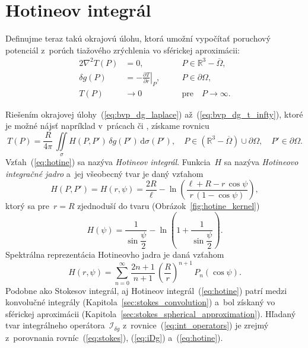 \documentclass[a4paper, 12pt]{book}
\newcommand{\diff}{\mathrm d}
\begin{document}
\section{Hotineov integrál}
\label{sec:hotine_integral}

Definujme teraz takú okrajovú úlohu, ktorá umožní vypočítať poruchový potenciál 
z~porúch tiažového zrýchlenia vo sférickej aproximácii:
%
\begin{alignat}{2}
\nabla^2 T(P) &= 0{,} &&P \in \mathbb{R}^3 
- \overline\Omega{,}\label{eq:bvp_dg_laplace}\\
\delta g(P) &= -\left.\frac{\partial T}{\partial r}\right|_P{,} \quad &&P \in 
\partial\Omega{,}\label{eq:bvp_dg_boundary_condition}\\
T(P) &\rightarrow 0 &&\textrm{pre} \quad P \rightarrow 
\infty{.}\label{eq:bvp_dg_t_infty}
\end{alignat}

Riešením okrajovej úlohy~(\ref{eq:bvp_dg_laplace}) 
až~(\ref{eq:bvp_dg_t_infty}), ktoré je možné nájsť napríklad v~prácach 
\textcite{MoritzPhysicalGeodesy} či \textcite{SansoGeoidDetermination}, získame 
rovnicu
%
\begin{equation}
\label{eq:hotine}
T(P) = \frac{R}{4\pi} \, \iint\limits_{\sigma} H(P, P') \, \delta g(P') \, 
\diff \sigma(P'){,} \quad P \in \left( \mathbb{R}^3 - \overline\Omega \right) 
\cup \partial\Omega{,} \quad P' \in \partial\Omega{.}
\end{equation}
%
Vzťah~(\ref{eq:hotine}) sa nazýva \emph{Hotineov integrál}.  Funkcia~$H$ sa 
nazýva \emph{Hotineovo integračné jadro} a~jej všeobecný tvar je daný vzťahom 
\parencite{SansoGeoidDetermination}
%
\begin{equation}
\label{eq:hotine_kernel_general}
H(P, P') = H(r, \psi) = \frac{2R}{\ell} - \ln\left(\frac{\ell + R - r \, 
\cos\psi}{r \, (1 - \cos\psi)}\right){,}
\end{equation}
%
ktorý sa pre~$r = R$ zjednoduší do tvaru (Obrázok~\ref{fig:hotine_kernel})
%
\begin{equation}
\label{eq:hotine_kernel}
H(\psi) = \frac{1}{\sin\dfrac{\psi}{2}} - \ln\left( 
1 + \frac{1}{\sin\dfrac{\psi}{2}} \right){.}
\end{equation}
%
Spektrálna reprezentácia Hotineovho jadra je daná vzťahom
%
\begin{equation}
\label{eq:hotine_spectral}
H(r, \psi) = \sum_{n = 0}^{\infty} \frac{2n + 1}{n + 1} \, \left( \frac{R}{r} 
\right)^{n + 1} \, P_n(\cos\psi){.}
\end{equation}
%
Podobne ako Stokesov integrál, aj Hotineov integrál~(\ref{eq:hotine}) patrí 
medzi konvolučné integrály (Kapitola~\ref{sec:stokes_convolution}) a~bol 
získaný vo sférickej aproximácii 
(Kapitola~\ref{sec:stokes_spherical_approximation}).  Hľadaný tvar integrálneho 
operátora~$\mathcal{I}_{\delta g}$ z~rovnice~(\ref{eq:int_operators}) je zrejmý 
z~porovnania rovníc~(\ref{eq:stokes}), (\ref{eq:iDg}) a~(\ref{eq:hotine}).
\end{document}
